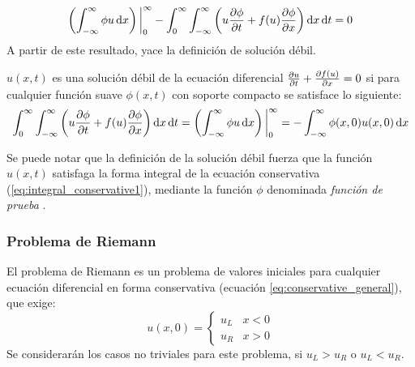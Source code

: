 \documentclass[12pt]{article}
\begin{document}
	 \begin{equation}
	 	\left( \int_{-\infty}^{\infty} \phi u \dd{x} \right)\bigg|_{0}^{\infty} - \int_{0}^{\infty}\int_{-\infty}^{\infty}\left( u\pdv{\phi}{t} + f(u)\pdv{\phi}{x}\right)\dd{x}\dd{t}=0
	 	\label{eq:integral_conservative2}
	 \end{equation}
	A partir de este resultado, yace la definición de solución débil.
	
	
	
	\begin{definition}
		$u(x,t)$ es una solución débil de la ecuación diferencial $\pdv{u}{t} + \pdv{f(u)}{x}=0$ si para cualquier función suave $\phi(x,t)$ con soporte compacto se satisface lo siguiente:
		\begin{equation}
			\int_{0}^{\infty}\int_{-\infty}^{\infty}\left( u\pdv{\phi}{t} + f(u)\pdv{\phi}{x}\right)\dd{x}\dd{t}=\left( \int_{-\infty}^{\infty} \phi u \dd{x} \right)\bigg|_{0}^{\infty}=-\int_{-\infty}^{\infty}\phi (x,0)u(x,0)\dd{x}
			\label{eq:weak_sol_cond}
		\end{equation}
	\end{definition}
	Se puede notar que la definición de la solución débil fuerza que la función $u(x,t)$ satisfaga la forma integral de la ecuación conservativa (\ref{eq:integral_conservative1}), mediante la función $\phi$ denominada \textit{función de prueba} \cite{Cameron}.
	
	\subsubsection{Problema de Riemann}
	El problema de Riemann es un problema de valores iniciales para cualquier ecuación diferencial en forma conservativa (ecuación \ref{eq:conservative_general}), que exige:
	\begin{equation}
		u(x,0) =
		\begin{cases}
			u_{L} & x < 0 \\
			u_{R} & x > 0
		\end{cases}
	\end{equation}
	Se considerarán los casos no triviales para este problema, si $u_L > u_R$ o $u_L < u_R$.
\end{document}

